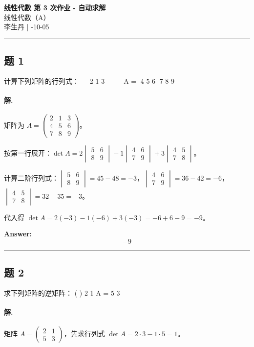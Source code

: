 \documentclass[12pt, a4paper]{article}
\newcommand{\problem}[1]{\subsection*{题 #1}}
\newcommand{\solution}{\paragraph{解.}}
\begin{document}
\begin{center}
    {\LARGE\bfseries 线性代数 第 3 次作业 - 自动求解} \\[0.5em]
    {\large 线性代数（A）} \\[0.3em]
    李生丹 \quad | -10-05
\end{center}

\hrule
\vspace{1em}
\problem{1}

计算下列矩阵的行列式：  
2 1 3
 
 
A = 4 5 6
7 8 9

\solution

矩阵为 $A=\begin{pmatrix}2&1&3\\4&5&6\\7&8&9\end{pmatrix}$。

按第一行展开：$\det A=2\begin{vmatrix}5&6\\8&9\end{vmatrix}-1\begin{vmatrix}4&6\\7&9\end{vmatrix}+3\begin{vmatrix}4&5\\7&8\end{vmatrix}$。

计算二阶行列式：$\begin{vmatrix}5&6\\8&9\end{vmatrix}=45-48=-3$，$\begin{vmatrix}4&6\\7&9\end{vmatrix}=36-42=-6$，$\begin{vmatrix}4&5\\7&8\end{vmatrix}=32-35=-3$。

代入得 $\det A=2(-3)-1(-6)+3(-3)=-6+6-9=-9$。

\textbf{Answer:}
\[\boxed{-9}\]

\vspace{1em}
\hrule
\vspace{1em}

\problem{2}

求下列矩阵的逆矩阵： ( )
2 1
A =
5 3

\solution

矩阵 $A=\begin{pmatrix}2&1\\5&3\end{pmatrix}$，先求行列式 $\det A=2\cdot3-1\cdot5=1$。
\end{document}
